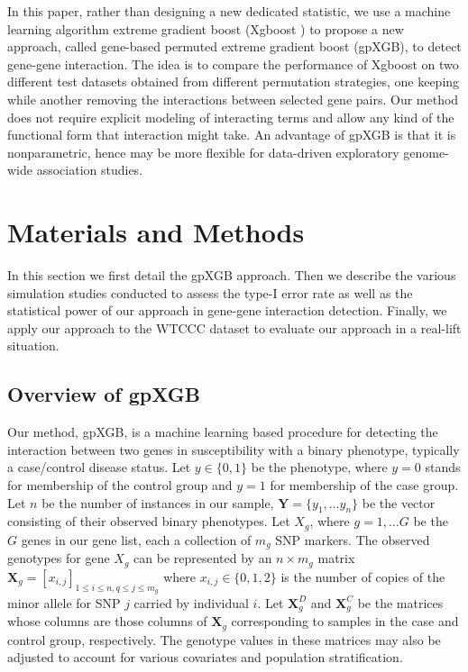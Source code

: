 \documentclass[11pt]{article}
\theoremstyle{plain}
\theoremstyle{definition}
\theoremstyle{remark}
\begin{document}
In this paper, rather than designing a new dedicated statistic, we use a machine learning algorithm extreme gradient boost (Xgboost \cite{9}) to propose a new approach, called gene-based permuted extreme gradient boost (gpXGB), to detect gene-gene interaction. The idea is to compare the performance of Xgboost on two different test datasets obtained from different permutation strategies, one keeping while another removing the interactions between selected gene pairs. Our method does not require explicit modeling of interacting terms and allow any kind of the functional form that interaction might take. An advantage of gpXGB is that it is nonparametric, hence may be more flexible for data-driven exploratory genome-wide association studies.

\section{Materials and Methods}


In this section we first detail the gpXGB approach. Then we describe the various simulation studies conducted to assess the type-I error rate as well as the statistical power of our approach in gene-gene interaction detection. Finally, we apply our approach to the WTCCC dataset to evaluate our approach in a real-lift situation.

\subsection{Overview of gpXGB}

Our method, gpXGB, is a machine learning based procedure for detecting the interaction between two genes in susceptibility with a binary phenotype, typically a case/control disease status. Let $y\in\{0,1\}$ be the phenotype, where $y=0$ stands for membership of the control group and $y=1$ for membership of the case group. Let $n$ be the number of instances in our sample, $\mathbf{Y}=\{y_1,\dots y_n\}$ be the vector consisting of their observed binary phenotypes. Let $X_g$, where $g=1,\dots G$ be the $G$ genes in our gene list, each a collection of $m_g$ SNP markers. The observed genotypes for gene $X_g$ can be represented by an $n\times m_g$ matrix $\mathbf{X}_g=\left[x_{i,j}\right]_{1\leq i\leq n,q\leq j\leq m_g}$ where $x_{i,j}\in\{0,1,2\}$ is the number of copies of the minor allele for SNP $j$ carried by individual $i$. Let $\mathbf{X}^D_g$ and $\mathbf{X}^C_g$ be the matrices whose columns are those columns of $\mathbf{X}_g$ corresponding to samples in the case and control group, respectively. The genotype values in these matrices may also be adjusted to account for various covariates and population stratification.\\
\end{document}
